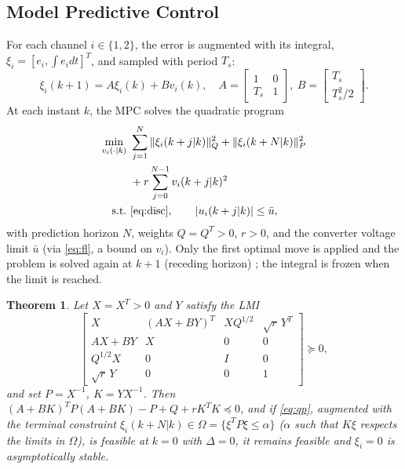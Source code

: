 \documentclass[conference]{IEEEtran}
\newtheorem{theorem}{Theorem}
\begin{document}
\subsection{Model Predictive Control}
For each channel $i\in\{1,2\}$, the error is augmented with its integral, $\xi_i = [e_i, \int e_i dt]^T$, and sampled with period $T_s$:
\begin{equation}
\xi_i(k{+}1) = A\xi_i(k) + Bv_i(k),\quad A = \begin{bmatrix}1 & 0\\ T_s & 1\end{bmatrix},\ B = \begin{bmatrix}T_s\\ T_s^2/2\end{bmatrix}.
\label{eq:disc}
\end{equation}
At each instant $k$, the MPC solves the quadratic program
\begin{equation}
\begin{aligned}
\min_{v_i(\cdot|k)}\ & \sum_{j=1}^{N}\|\xi_i(k+j|k)\|_Q^2 + \|\xi_i(k+N|k)\|_P^2\\
& + r\sum_{j=0}^{N-1}v_i(k+j|k)^2\\
\text{s.t.}\ & \eqref{eq:disc},\qquad |u_i(k+j|k)|\le\bar{u},
\end{aligned}
\label{eq:qp}
\end{equation}
with prediction horizon $N$, weights $Q = Q^T > 0$, $r > 0$, and the converter voltage limit $\bar{u}$ (via \eqref{eq:fl}, a bound on $v_i$). Only the first optimal move is applied and the problem is solved again at $k+1$ (receding horizon) \cite{Mayne2000}; the integral is frozen when the limit is reached.

\begin{theorem}
Let $X = X^T > 0$ and $Y$ satisfy the LMI
\begin{equation}
\begin{bmatrix}
X & (AX+BY)^T & XQ^{1/2} & \sqrt{r}\,Y^T\\
AX+BY & X & 0 & 0\\
Q^{1/2}X & 0 & I & 0\\
\sqrt{r}\,Y & 0 & 0 & 1
\end{bmatrix}\succeq 0,
\label{eq:lmi}
\end{equation}
and set $P = X^{-1}$, $K = YX^{-1}$. Then $(A+BK)^TP(A+BK) - P + Q + rK^TK\preceq0$, and if \eqref{eq:qp}, augmented with the terminal constraint $\xi_i(k+N|k)\in\Omega = \{\xi^TP\xi\le\alpha\}$ ($\alpha$ such that $K\xi$ respects the limits in $\Omega$), is feasible at $k=0$ with $\Delta = 0$, it remains feasible and $\xi_i = 0$ is asymptotically stable.
\end{theorem}
\end{document}
